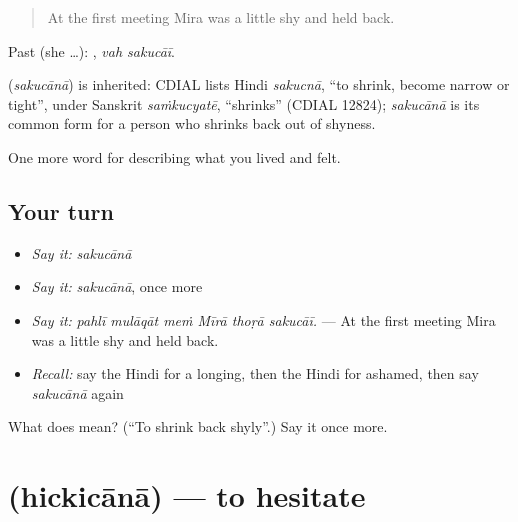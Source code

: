 \begin{quote}
At the first meeting Mira was a little shy and held back.
\end{quote}

Past (she …):  , \emph{vah sakucāī}.

\begin{cousinweb}
\textbf{} (\emph{sakucānā}) is inherited: CDIAL lists Hindi \emph{sakucnā}, \textquotedblleft{}to shrink, become narrow or tight\textquotedblright{}, under Sanskrit \emph{saṁkucyatē}, \textquotedblleft{}shrinks\textquotedblright{} (CDIAL 12824); \emph{sakucānā} is its common form for a person who shrinks back out of shyness.
\end{cousinweb}

\begin{grammarlens}[title={What you've built}]
One more word for describing what you lived and felt.
\end{grammarlens}

\subsection*{Your turn}
\begin{itemize}
\raggedright
  \item \emph{Say it:} \emph{sakucānā}
  \item \emph{Say it:} \emph{sakucānā}, once more
  \item \emph{Say it:} \emph{pahlī mulāqāt meṁ Mīrā thoṛā sakucāī.} — At the first meeting Mira was a little shy and held back.
  \item \emph{Recall:} say the Hindi for a longing, then the Hindi for ashamed, then say \emph{sakucānā} again
\end{itemize}

\begin{tcolorbox}[breakable,colback=teal!4,colframe=teal!35!black,title={Before you move on}]
What does  mean? (\textquotedblleft{}To shrink back shyly\textquotedblright{}.) Say it once more.
\end{tcolorbox}
\section[\texorpdfstring{\hi{हिचकिचाना} (hickicānā)}{हिचकिचाना (hickicānā)}]{ (hickicānā) — to hesitate}

\label{lesson:HI-C461-hickicana}




